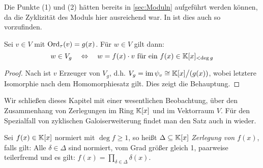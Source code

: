 \begin{bemerkung}
  Die Punkte (1) und (2) hätten bereits in \autoref{sec:Moduln} aufgeführt
  werden können, da die Zyklizität des Moduls hier ausreichend war.
  In \autocite[Theorem 7.10]{hachenberger1997finite} ist dies auch so
  vorzufinden.
\end{bemerkung}

\begin{kor}
  \label{kor:moduln_ueber_v_g}
  Sei $v \in V$ mit $\operatorname{Ord}_\tau(v) = g(x)$.
  Für $w \in V$ gilt dann:
  \[ w \in V_g \quad\Leftrightarrow\quad 
    w = f(x)\cdot v \text{ für ein } f(x) \in \mathbb{K}[x]_{< \deg g}\]
\end{kor}
\begin{proof}
  Nach  ist $v$ Erzeuger von $V_g$, d.h.
  $V_g = \operatorname{im} \psi_v \cong \mathbb{K}[x]\big/(g(x))$, wobei letztere Isomorphie nach dem
  Homomorphiesatz gilt. Dies zeigt die Behauptung.
\end{proof}


Wir schließen dieses Kapitel mit einer wesentlichen Beobachtung, über den
Zusammenhang von Zerlegungen im Ring $\mathbb{K}[x]$ und im Vektorraum $V$. 
Für den Spezialfall von zyklischen Galoiserweiterung findet man den Satz auch
in \autocite[Theorem 8.6]{hachenberger1997finite} wieder.

\begin{definition}[Zerlegung]
  Sei $f(x)\in \mathbb{K}[x]$ normiert mit $\deg f \geq 1$, so heißt 
  $\Delta \subseteq \mathbb{K}[x]$ \emph{Zerlegung von $f(x)$}, falls gilt: Alle
  $\delta \in \Delta$ sind normiert, vom Grad größer gleich 1, paarweise
  teilerfremd und es gilt: $f(x) = \prod_{\delta\in \Delta} \delta(x)$.
\end{definition}



